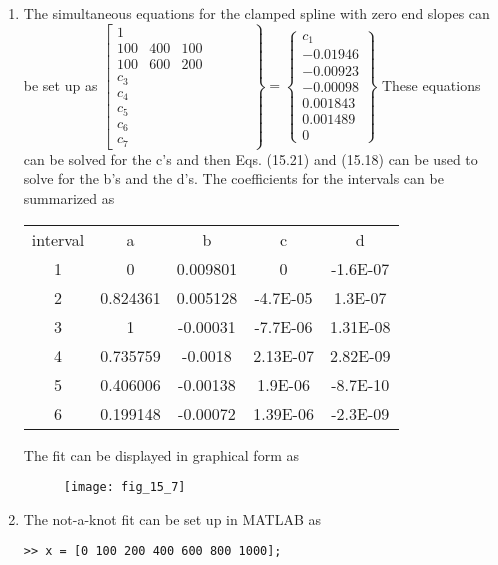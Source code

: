 \documentclass[../main.tex]{subfiles}
\begin{document}
\section{}
\begin{enumerate}[label=\bfseries(\alph*)]
\item The simultaneous equations for the clamped spline with zero end slopes can be set up as 
	\bigbreak
$
\left[\begin{array}{ccccccc}
1 & & & & & \\
100 & 400 & 100 & & & & \\
100 & 600 & 200 & & & \\
c_{3} \\
c_{4} \\
c_{5} \\
c_{6} \\
c_{7}
\end{array}\right\}=\left\{\begin{array}{l}
c_{1} \\
-0.01946 \\
-0.00923 \\
-0.00098 \\
0.001843 \\
0.001489 \\
0
\end{array}\right\}
$
	\bigbreak
These equations can be solved for the c’s and then Eqs. (15.21) and (15.18) can be used to
solve for the b’s and the d’s. The coefficients for the intervals can be summarized as
	\bigbreak
\begin{tabular}{ccccc}
interval&a&b&c&d\\
1&0&0.009801&0&-1.6E-07\\
2&0.824361&0.005128&-4.7E-05&1.3E-07\\
3&1&-0.00031&-7.7E-06&1.31E-08\\
4&0.735759&-0.0018&2.13E-07&2.82E-09\\
5&0.406006&-0.00138&1.9E-06&-8.7E-10\\
6&0.199148&-0.00072&1.39E-06&-2.3E-09
\end{tabular}
	\bigbreak
The fit can be displayed in graphical form as
	\bigbreak
	\begin{figure}[H]
		\texttt{[image: fig\_15\_7]}
		\label{fig:fig_15_7}
	\end{figure}
	\bigbreak
\item The not-a-knot fit can be set up in MATLAB as
	\bigbreak
\begin{lstlisting}[numbers=none]
>> x = [0 100 200 400 600 800 1000];

\end{lstlisting}
\end{enumerate}
\end{document}
